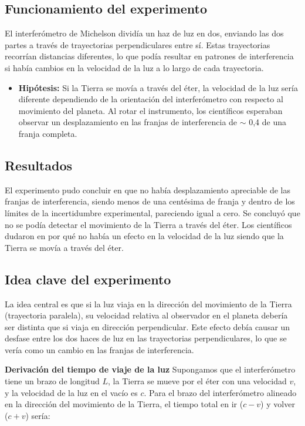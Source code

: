 \documentclass[a4paper, 12pt]{article}
\begin{document}
		\subsection{Funcionamiento del experimento}
		\indent El interferómetro de Michelson dividía un haz de luz en dos, enviando las dos partes a través de trayectorias perpendiculares entre sí. Estas trayectorias recorrían distancias diferentes, lo que podía resultar en patrones de interferencia si había cambios en la velocidad de la luz a lo largo de cada trayectoria.
		\begin{itemize}
			\item \textbf{Hipótesis:} Si la Tierra se movía a través del éter, la velocidad de la luz sería diferente dependiendo de la orientación del interferómetro con respecto al movimiento del planeta. Al rotar el instrumento, los científicos esperaban observar un desplazamiento en las franjas de interferencia de $\sim$ 0,4 de una franja completa.
		\end{itemize}
		
		\subsection{Resultados}
		\indent El experimento pudo concluir en que no había desplazamiento apreciable de las franjas de interferencia, siendo menos de una centésima de franja y dentro de los límites de la incertidumbre experimental, pareciendo igual a cero. Se concluyó que no se podía detectar el movimiento de la Tierra a través del éter.
		\indent Los científicos dudaron en por qué no había un efecto en la velocidad de la luz siendo que la Tierra se movía a través del éter.
		
		\subsection{Idea clave del experimento}
		\indent La idea central es que si la luz viaja en la dirección del movimiento de la Tierra (trayectoria paralela), su velocidad relativa al observador en el planeta debería ser distinta que si viaja en dirección perpendicular. \newline
		\indent Este efecto debía causar un desfase entre los dos haces de luz en las trayectorias perpendiculares, lo que se vería como un cambio en las franjas de interferencia.\newline
		
		\textbf{Derivación del tiempo de viaje de la luz} \newline
		\indent Supongamos que el interferómetro tiene un brazo de longitud $L$, la Tierra se mueve por el éter con una velocidad $v$, y la velocidad de la luz en el vacío es $c$. \newline
		\indent Para el brazo del interferómetro alineado en la dirección del movimiento de la Tierra, el tiempo total en ir ($c-v$) y volver ($c+v$) sería:
		
\end{document}

